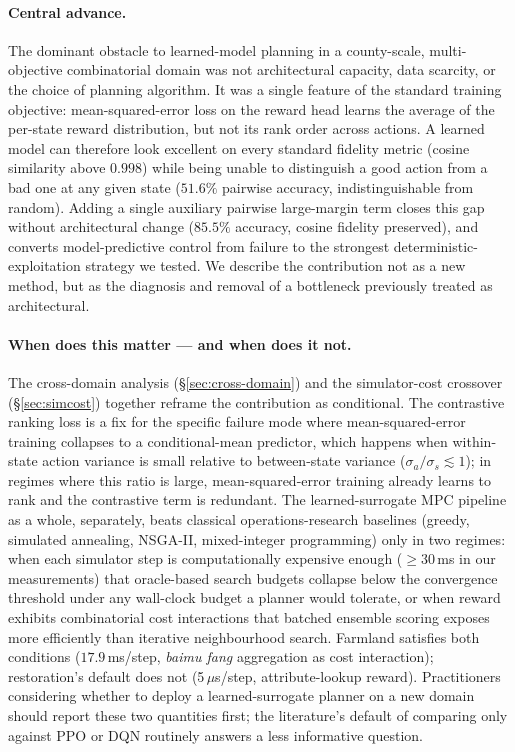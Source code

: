 \documentclass[11pt]{article}
\begin{document}
\paragraph{Central advance.} The dominant obstacle to learned-model planning in a county-scale, multi-objective combinatorial domain was not architectural capacity, data scarcity, or the choice of planning algorithm. It was a single feature of the standard training objective: mean-squared-error loss on the reward head learns the average of the per-state reward distribution, but not its rank order across actions. A learned model can therefore look excellent on every standard fidelity metric (cosine similarity above $0.998$) while being unable to distinguish a good action from a bad one at any given state ($51.6\%$ pairwise accuracy, indistinguishable from random). Adding a single auxiliary pairwise large-margin term closes this gap without architectural change ($85.5\%$ accuracy, cosine fidelity preserved), and converts model-predictive control from failure to the strongest deterministic-exploitation strategy we tested. We describe the contribution not as a new method, but as the diagnosis and removal of a bottleneck previously treated as architectural.

\paragraph{When does this matter — and when does it not.} The cross-domain analysis (\S\ref{sec:cross-domain}) and the simulator-cost crossover (\S\ref{sec:simcost}) together reframe the contribution as conditional. The contrastive ranking loss is a fix for the specific failure mode where mean-squared-error training collapses to a conditional-mean predictor, which happens when within-state action variance is small relative to between-state variance ($\sigma_a / \sigma_s \lesssim 1$); in regimes where this ratio is large, mean-squared-error training already learns to rank and the contrastive term is redundant. The learned-surrogate MPC pipeline as a whole, separately, beats classical operations-research baselines (greedy, simulated annealing, NSGA-II, mixed-integer programming) only in two regimes: when each simulator step is computationally expensive enough ($\geq 30$\,ms in our measurements) that oracle-based search budgets collapse below the convergence threshold under any wall-clock budget a planner would tolerate, or when reward exhibits combinatorial cost interactions that batched ensemble scoring exposes more efficiently than iterative neighbourhood search. Farmland satisfies both conditions ($17.9$\,ms/step, \textit{baimu fang} aggregation as cost interaction); restoration's default does not (5\,$\mu$s/step, attribute-lookup reward). Practitioners considering whether to deploy a learned-surrogate planner on a new domain should report these two quantities first; the literature's default of comparing only against PPO or DQN routinely answers a less informative question.
\end{document}
